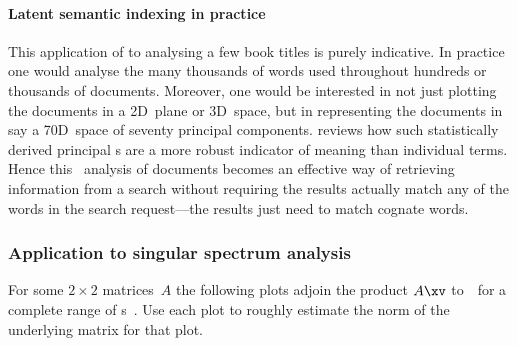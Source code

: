 \paragraph{Latent semantic indexing in practice}
This application of  to analysing a few book titles is purely indicative.
In practice one would analyse the many thousands of words used throughout hundreds or thousands of documents. 
Moreover, one would be interested in not just plotting the documents in a 2D~plane or 3D~space, but in representing the documents in say a 70D~space of seventy principal components.
\cite{Berry95} reviews how such statistically derived principal s are a more robust indicator of meaning than individual terms.  
Hence this \svd\ analysis of documents becomes an effective way of retrieving information from a search without requiring the results actually match any of the words in the search request---the results just need to match cognate words.









\begin{draft}
\subsubsection {Application to singular spectrum analysis}
\label{sec:ssa}

\begin{comment}
Follow up \autoref{eg:orthbapp} on the \textsc{soi} to introduce the use of singular spectrum analysis. 
\end{comment}

\end{draft}









\sectionExercises


\begin{exercise} \label{ex:} 
For some \(2\times2\) matrices~\(A\) the following plots adjoin the product \(A\xv\) to~\xv\ for a complete range of s~\xv.
Use each plot to roughly estimate the norm of the underlying matrix for that plot.
\begin{parts}
\item {}
\item {}
\item {}
\item {}
\item {}
\item {}
\end{parts}
\end{exercise}


